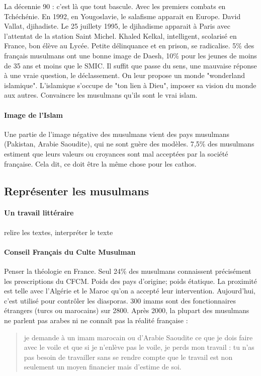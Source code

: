 La décennie 90 : c'est là que tout bascule. Avec les premiers combats en Tchéchénie. En 1992, en Yougoslavie, le salafisme apparait en Europe. David Vallat, djihadiste. Le 25 juillety 1995, le djihadisme apparait à Paris avec l'attentat de la station Saint Michel. 
Khaled Kelkal, intelligent, scolarisé en France, bon élève au Lycée. Petite délinquance et en prison, se radicalise. 5\% des français musulmans ont une bonne image de Daesh, 10\% pour les jeunes de moins de 35 ans et moins que le SMIC. Il suffit que passe du sens, une mauvaise réponse à une vraie question, le déclassement. On leur propose un monde "wonderland islamique". L'islamique s'occupe de "ton lien à Dieu", imposer sa vision du monde aux autres. Convaincre les musulmans qu'ils sont le vrai islam.

\paragraph{Image de l'Islam } Une partie de l'image négative des musulmans vient des pays musulmans (Pakistan, Arabie Saoudite), qui ne sont guère des modèles. 7,5\% des musulmans estiment que leurs valeurs ou croyances sont mal acceptées par la société française. Cela dit, ce doit être la même chose pour les cathos.

\subsection{Représenter les musulmans}
\paragraph{Un travail littéraire} relire les textes, interpréter le texte

\paragraph{Conseil Français du Culte Musulman} Penser la théologie en France.  Seul 24\% des musulmans connaissent précisément les prescriptions du CFCM.
Poids des pays d'origine; poids étatique. La proximité est telle avec l'Algérie et le Maroc qu'on a accepté leur intervention. Aujourd'hui, c'est utilisé pour contrôler les diasporas.
300 imams sont des fonctionnaires étrangers (turcs ou marocains) sur 2800.
Après 2000, la plupart des musulmans ne parlent pas arabes ni ne connaît pas la réalité française : 
\begin{Ex}
\begin{quote}
je demande à un imam marocain ou d'Arabie Saoudite ce que je dois faire avec le voile et que si je n'enlève pas le voile, je perds mon travail : tu n'as pas besoin de travailler sans se rendre compte que le travail est non seulement un moyen financier mais d'estime de soi.
\end{quote}
\end{Ex}

